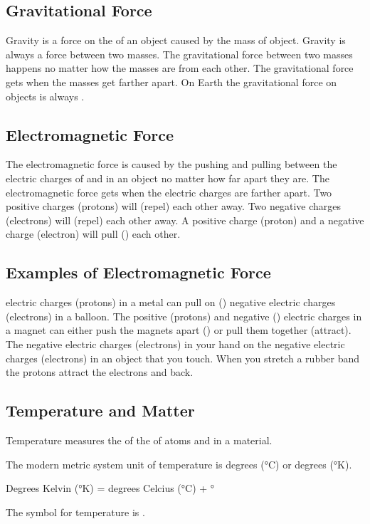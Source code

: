 \documentclass[12pt]{exam}
\begin{document}
\begin{questions}
\subsection{Gravitational Force}
\question Gravity is a force on the \fillin of an object caused by the mass of \fillin object.
\question Gravity is always a \fillin force between two masses.
\question The gravitational force between two masses happens no matter how \fillin the masses are from each other.
\question The gravitational force gets \fillin when the masses get farther apart.
\question On Earth the gravitational force on objects is always \fillin.

\subsection{Electromagnetic Force}

\question The electromagnetic force is caused by the pushing and pulling between the electric charges of \fillin and \fillin in an object no matter how far apart they are.
\question The electromagnetic force gets \fillin when the electric charges are farther apart.
\question Two positive charges (protons) will \fillin (repel) each other away.
\question Two negative charges (electrons) will \fillin (repel) each other away.
\question A positive charge (proton) and a negative charge (electron) will pull (\fillin) each other.

\subsection{Examples of Electromagnetic Force}

\question \fillin electric charges (protons) in a metal can pull on (\fillin) negative electric charges (electrons) in a balloon.
\question The positive (protons) and negative (\fillin) electric charges in a magnet can either push the magnets apart (\fillin) or pull them together (attract).
\question The negative electric charges (electrons) in your hand \fillin on the negative electric charges (electrons) in an object that you touch.
\question When you stretch a rubber band the protons attract the electrons and \fillin back.

\pagebreak

\subsection{Temperature and Matter}


\question Temperature measures the \fillin of the \fillin of atoms and \fillin in a material.

\question The modern metric system unit of temperature is degrees \fillin (°C) or degrees \fillin (°K).

\question Degrees Kelvin (°K) = degrees Celcius (°C) + \fillin°

\question The symbol for temperature is \fillin.


\end{questions}
\end{document}
